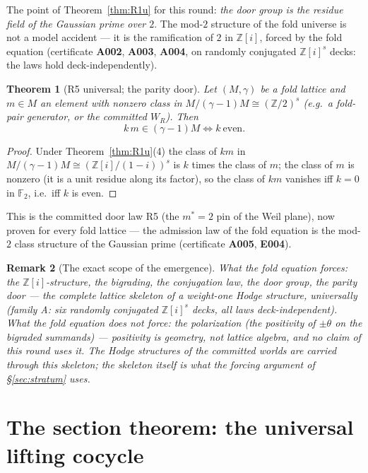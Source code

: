 \documentclass[11pt]{article}
\newcommand{\Z}{\mathbb Z}
\newcommand{\F}{\mathbb F}
\newtheorem{theorem}{Theorem}[section]
\newtheorem{remark}[theorem]{Remark}
\begin{document}
The point of Theorem~\ref{thm:R1u} for this round: \emph{the door
group is the residue field of the Gaussian prime over $2$}. The mod-$2$
structure of the fold universe is not a model accident --- it is the
ramification of $2$ in $\Z[i]$, forced by the fold equation
(certificate \textbf{A002}, \textbf{A003}, \textbf{A004}, on randomly
conjugated $\Z[i]^s$ decks: the laws hold deck-independently).

\begin{theorem}[R5 universal; the parity door]\label{thm:R5u}
Let $(M,\gamma)$ be a fold lattice and $m\in M$ an element with
nonzero class in $M/(\gamma-1)M\cong(\Z/2)^s$ (e.g.\ a fold-pair
generator, or the committed $W_R$). Then
\[
k\,m\in(\gamma-1)M\iff k\ \text{even}.
\]
\end{theorem}

\begin{proof}
Under Theorem~\ref{thm:R1u}(4) the class of $km$ in
$M/(\gamma-1)M\cong(\Z[i]/(1-i))^s$ is $k$ times the class of $m$;
the class of $m$ is nonzero (it is a unit residue along its factor),
so the class of $km$ vanishes iff $k=0$ in $\F_2$, i.e.\ iff $k$ is
even.
\end{proof}

This is the committed door law R5 (the $m^\ast=2$ pin of the Weil
plane), now proven for every fold lattice --- the admission law of the
fold equation is the mod-$2$ class structure of the Gaussian prime
(certificate \textbf{A005}, \textbf{E004}).

\begin{remark}[The exact scope of the emergence]\label{rem:emergence-scope}
What the fold equation forces: the $\Z[i]$-structure, the bigrading,
the conjugation law, the door group, the parity door --- the complete
\emph{lattice skeleton} of a weight-one Hodge structure, universally
(family A: six randomly conjugated $\Z[i]^s$ decks, all laws
deck-independent). What the fold equation does \emph{not} force: the
polarization (the positivity of $\pm\theta$ on the bigraded
summands) --- positivity is geometry, not lattice algebra, and no
claim of this round uses it. The Hodge structures of the committed
worlds are carried \emph{through} this skeleton; the skeleton itself is
what the forcing argument of \S\ref{sec:stratum} uses.
\end{remark}

\section{The section theorem: the universal lifting cocycle}
\label{sec:section}
\end{document}

